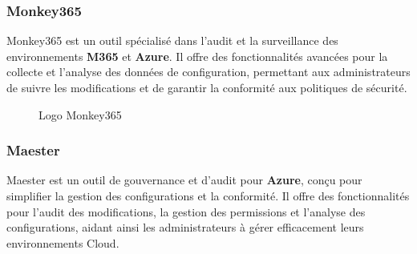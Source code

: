 \subsubsection{Monkey365}

Monkey365 est un outil spécialisé dans l'audit et la surveillance des environnements \textbf{M365} et \textbf{Azure}. Il offre des fonctionnalités avancées pour la collecte et l'analyse des données de configuration, permettant aux administrateurs de suivre les modifications et de garantir la conformité aux politiques de sécurité.

\begin{figure}[H]
    \begin{center}
        \caption{Logo Monkey365}
    \end{center}
\end{figure}
\vspace{-0.4cm}
\subsubsection{Maester}

Maester est un outil de gouvernance et d'audit pour \textbf{Azure}, conçu pour simplifier la gestion des configurations et la conformité. Il offre des fonctionnalités pour l'audit des modifications, la gestion des permissions et l'analyse des configurations, aidant ainsi les administrateurs à gérer efficacement leurs environnements Cloud.

